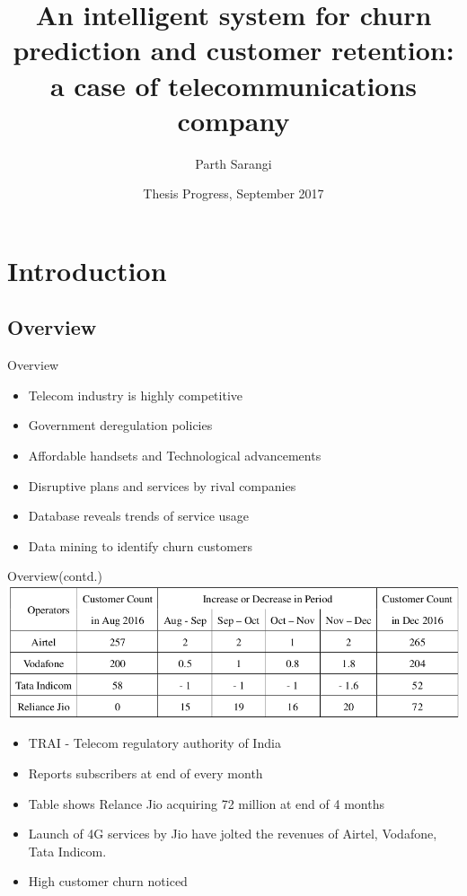 \documentclass{beamer}
\title{
		{An intelligent system for churn prediction and customer retention: a case of telecommunications company }
	}
\author{Parth Sarangi}%
\institute[Asian Institute of Technology Thailand] %
{
  Computer Science and Information Management\\
  Asian Institute of Technology Thailand
  }
\date{Thesis Progress, September 2017}
\begin{document}
\begin{frame}
  \titlepage
\end{frame}

\section{Introduction}

\subsection{Overview}
\begin{frame}{Overview}
	\begin{itemize}
		\item Telecom industry is highly competitive
		\item Government deregulation policies
		\item Affordable handsets and Technological advancements
		\item Disruptive plans and services by rival companies
		\item Database reveals trends of service usage
		\item Data mining to identify churn customers
	\end{itemize}
\end{frame}

\begin{frame}{Overview(contd.)}
	\includegraphics[scale = 0.35]{ppt_figures/introtable.png}
	\begin{itemize}
		\item TRAI - Telecom regulatory authority of India
		\item Reports subscribers at end of every month
		\item Table shows Relance Jio acquiring 72 million at end of 4 months
		\item Launch of 4G services by Jio have jolted the revenues of Airtel, Vodafone, Tata Indicom.
		\item High customer churn noticed
	\end{itemize}
\end{frame}
\end{document}
